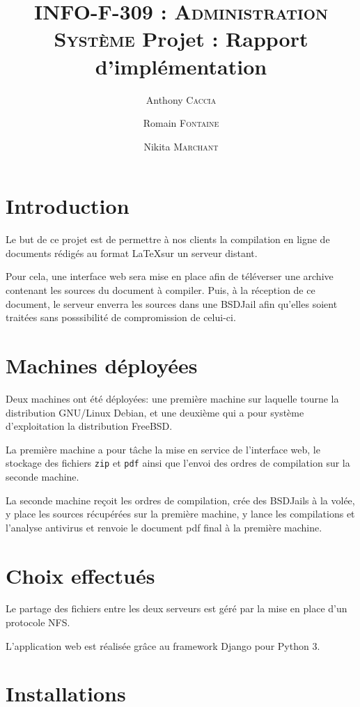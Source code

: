 \documentclass[10pt,a4paper]{article}
\author{Anthony \textsc{Caccia} \and Romain \textsc{Fontaine} \and Nikita \textsc{Marchant} }
\date{}
\title{\textsc{INFO-F-309 : Administration Système} Projet : Rapport d'implémentation}
\begin{document}
\maketitle

\section{Introduction}
\label{sec:Introduction}

Le but de ce projet est de permettre à nos clients la compilation en ligne de documents rédigés au format \LaTeX sur un serveur distant.

Pour cela, une interface web sera mise en place afin de téléverser une archive contenant les sources du document à compiler.
Puis, à la réception de ce document, le serveur enverra les sources dans une BSDJail afin qu'elles soient traitées sans posssibilité de compromission de celui-ci.

\section{Machines déployées}
\label{sec:Machines déployées}

Deux machines ont été déployées: une première machine sur laquelle tourne la distribution GNU/Linux Debian, et une deuxième qui a pour système d'exploitation la distribution FreeBSD.

La première machine a pour tâche la mise en service de l'interface web,
le stockage des fichiers \texttt{zip} et \texttt{pdf}
ainsi que l'envoi des ordres de compilation sur la seconde machine.

La seconde machine reçoit les ordres de compilation, crée des BSDJails à la volée, y place les sources récupérées sur la première machine,
y lance les compilations et l'analyse antivirus et renvoie le document pdf final à la première machine.

\section{Choix effectués}
\label{sec:Choix effectués}

Le partage des fichiers entre les deux serveurs est géré par la mise en place d'un protocole NFS.

L'application web est réalisée grâce au framework Django pour Python 3.

\section{Installations}
\label{sec:Installations}
\end{document}
